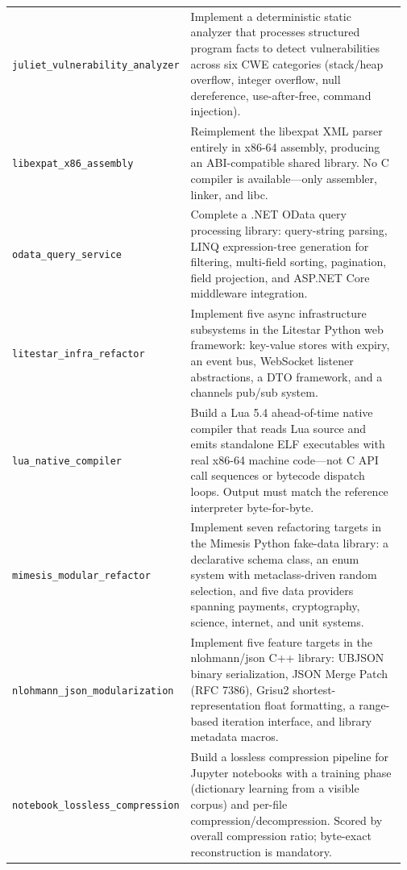 \begin{longtable}{@{}>{\raggedright\arraybackslash}p{0.20\linewidth}>{\raggedright\arraybackslash}p{0.77\linewidth}@{}}
\tasknoterule
\texttt{juliet\_\allowbreak{}vulnerability\_\allowbreak{}analyzer} & Implement a deterministic static analyzer that processes structured program facts to detect vulnerabilities across six CWE categories (stack/heap overflow, integer overflow, null dereference, use-after-free, command injection). \\
\tasknoterule
\texttt{libexpat\_\allowbreak{}x86\_\allowbreak{}assembly} & Reimplement the libexpat XML parser entirely in x86-64 assembly, producing an ABI-compatible shared library. No C compiler is available---only assembler, linker, and libc. \\
\tasknoterule
\texttt{odata\_\allowbreak{}query\_\allowbreak{}service} & Complete a .NET OData query processing library: query-string parsing, LINQ expression-tree generation for filtering, multi-field sorting, pagination, field projection, and ASP.NET Core middleware integration. \\
\tasknoterule
\texttt{litestar\_\allowbreak{}infra\_\allowbreak{}refactor} & Implement five async infrastructure subsystems in the Litestar Python web framework: key-value stores with expiry, an event bus, WebSocket listener abstractions, a DTO framework, and a channels pub/sub system. \\
\tasknoterule
\texttt{lua\_\allowbreak{}native\_\allowbreak{}compiler} & Build a Lua 5.4 ahead-of-time native compiler that reads Lua source and emits standalone ELF executables with real x86-64 machine code---not C API call sequences or bytecode dispatch loops. Output must match the reference interpreter byte-for-byte. \\
\tasknoterule
\texttt{mimesis\_\allowbreak{}modular\_\allowbreak{}refactor} & Implement seven refactoring targets in the Mimesis Python fake-data library: a declarative schema class, an enum system with metaclass-driven random selection, and five data providers spanning payments, cryptography, science, internet, and unit systems. \\
\tasknoterule
\texttt{nlohmann\_\allowbreak{}json\_\allowbreak{}modularization} & Implement five feature targets in the nlohmann/json C++ library: UBJSON binary serialization, JSON Merge Patch (RFC 7386), Grisu2 shortest-representation float formatting, a range-based iteration interface, and library metadata macros. \\
\tasknoterule
\texttt{notebook\_\allowbreak{}lossless\_\allowbreak{}compression} & Build a lossless compression pipeline for Jupyter notebooks with a training phase (dictionary learning from a visible corpus) and per-file compression/decompression. Scored by overall compression ratio; byte-exact reconstruction is mandatory. \\

\end{longtable}
